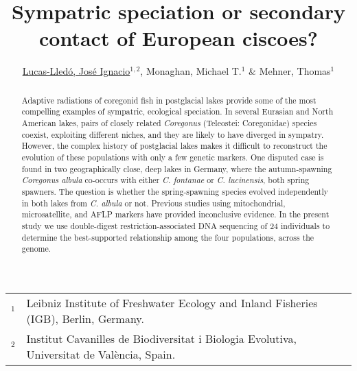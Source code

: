 \documentclass[a4paper,12pt]{article}
\author{\small \underline{Lucas-Lled\'o, Jos\'e Ignacio}$^{1,2}$, Monaghan, Michael T.$^1$ \& Mehner, Thomas$^1$}
\title{Sympatric speciation or secondary contact of European ciscoes?}
\date{}
\begin{document}
\maketitle
\begin{center}
{\scriptsize
\begin{tabular}{ll}
$^1$&Leibniz Institute of Freshwater Ecology and Inland Fisheries (IGB), Berlin, Germany.\\
$^2$&Institut Cavanilles de Biodiversitat i Biologia Evolutiva, Universitat de València, Spain.\\
\end{tabular}
}
\end{center}
\begin{abstract}
Adaptive radiations of coregonid fish in postglacial lakes provide some of the most compelling examples of sympatric, ecological speciation. In several Eurasian and North American lakes, pairs of closely related \emph{Coregonus} (Teleostei: Coregonidae) species coexist, exploiting different niches, and they are likely to have diverged in sympatry. However, the complex history of postglacial lakes makes it difficult to reconstruct the evolution of these populations with only a few genetic markers. One disputed case is found in two geographically close, deep lakes in Germany, where the autumn-spawning \emph{Coregonus albula} co-occurs with either \emph{C. fontanae} or \emph{C. lucinensis}, both spring spawners. The question is whether the spring-spawning species evolved independently in both lakes from \emph{C. albula} or not. Previous studies using mitochondrial, microsatellite, and AFLP markers have provided inconclusive evidence. In the present study we use double-digest restriction-associated DNA sequencing of 24 individuals to determine the best-supported relationship among the four populations, across the genome.
\end{abstract}
\end{document}
